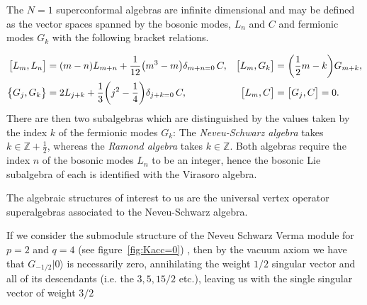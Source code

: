\documentclass[a4paper,reqno,12pt]{report}
\theoremstyle{definition}
\newcommand{\ket}{\rangle}
\numberwithin{equation}{section}
\let\originalleft\left     %
\let\originalright\right
\renewcommand{\left}{\mathopen{}\mathclose\bgroup\originalleft}
\renewcommand{\right}{\aftergroup\egroup\originalright}
\newcommand{\brac}[1]{\left( #1 \right)}
\newcommand{\ZZ}{\mathbb{Z}}
\newcommand{\comm}[2]{\bigl[ #1 , #2 \bigr]}
\newcommand{\acomm}[2]{\bigl\{ #1 , #2 \bigr\}}
\newcommand{\Fock}[1]{\mathcal{F}_{#1}}      %
\newcommand{\ns}{Neveu-Schwarz}
\theoremstyle{plain}
\begin{document}
The $N=1$ superconformal algebras are infinite dimensional and may be defined as the vector spaces spanned by the bosonic modes, $L_n$ and $C$ and fermionic modes $G_k$ with the following bracket relations.

\begin{equation} \label{eq:CommN=1}
\begin{aligned}
\comm{L_m}{L_n} &= \brac{m-n} L_{m+n} + \frac{1}{12} \brac{m^3-m} \delta_{m+n=0} \, C, & \comm{L_m}{G_k} &= \brac{\frac{1}{2} m - k} G_{m+k}, \\
\acomm{G_j}{G_k} &= 2 L_{j+k} + \frac{1}{3} \brac{j^2-\frac{1}{4}} \delta_{j+k=0} \, C, & \comm{L_m}{C} &= \comm{G_j}{C} = 0.
\end{aligned}
\end{equation}
There are then two subalgebras which are distinguished by the values taken by the index $k$ of the fermionic modes $G_k$:  The \emph{\ns{} algebra} takes $k \in \ZZ + \frac{1}{2}$, whereas the \emph{Ramond algebra} takes $k \in \ZZ$.  Both algebras require the index $n$ of the bosonic modes $L_n$ to be an integer, hence the bosonic Lie subalgebra of each is identified with the Virasoro algebra.

The algebraic structures of interest to us are the universal vertex operator superalgebras associated to the \ns{} algebra. 


If we consider the submodule structure of the Neveu Schwarz Verma module for $p=2$ and $q=4$ (see figure~\ref{fig:Kacc=0}) , then by the vacuum axiom we have that $G_{-1/2}|0\ket$ is necessarily zero, annihilating the weight $1/2$ singular vector and all of its descendants (i.e. the $3,5,15/2$ etc.), leaving us with the single singular vector of weight $3/2$

%

\begin{center}
\end{center}
\end{document}
